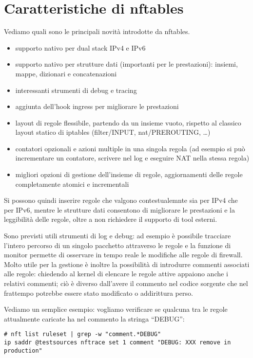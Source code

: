 \section{Caratteristiche di nftables}
Vediamo quali sono le principali novit\`a introdotte da nftables.
\begin{itemize}
    \item supporto nativo per dual stack IPv4 e IPv6
    \item supporto nativo per strutture dati (importanti per le prestazioni):
    insiemi, mappe, dizionari e concatenazioni
    \item interessanti strumenti di debug e tracing
    \item aggiunta dell'hook ingress per migliorare le prestazioni
    \item layout di regole flessibile, partendo da un insieme vuoto, rispetto
    al classico layout statico di iptables (filter/INPUT, nat/PREROUTING,
    \ldots)
    \item contatori opzionali e azioni multiple in una singola regola (ad
        esempio si pu\`o incrementare un contatore, scrivere nel log e eseguire NAT nella
    stessa regola)
    \item migliori opzioni di gestione dell'insieme di regole, aggiornamenti
    delle regole completamente atomici e incrementali
\end{itemize}
Si possono quindi inserire regole che valgono contestualemnte sia per IPv4 che
per IPv6,
mentre le strutture dati consentono di migliorare le prestazioni e la
leggibilit\`a delle regole, oltre a non richiedere il supporto di tool
esterni.

Sono previsti utili strumenti di log e debug: ad esempio \`e possibile
tracciare l'intero percorso di un singolo pacchetto attraverso le regole e la
funzione di monitor permette di osservare in tempo reale le modifiche alle
regole di firewall.  Molto utile per la gestione è inoltre la possibilità di
introdurre commenti associati alle regole: chiedendo al kernel di elencare le
regole attive appaiono anche i relativi commenti; ci\`o \`e diverso dall'avere
il commento nel codice sorgente che nel frattempo potrebbe essere stato
modificato o addirittura perso.

Vediamo un semplice esempio: vogliamo verificare se qualcuna tra le regole
attualmente caricate ha nel commento la stringa ``DEBUG'':
\begin{lstlisting}
# nft list ruleset | grep -w "comment.*DEBUG"
ip saddr @testsources nftrace set 1 comment "DEBUG: XXX remove in production"
\end{lstlisting}

